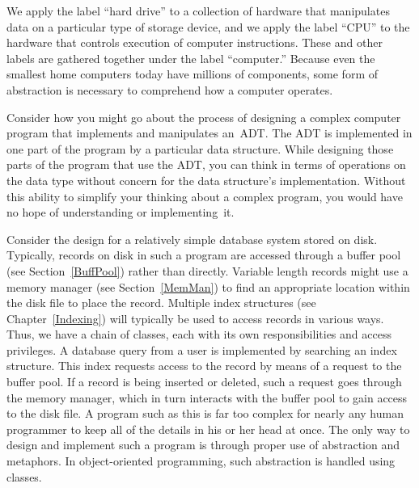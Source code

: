 \begin{example}
We apply the label ``hard drive'' to a collection of
hardware that manipulates data on a particular type of
storage device, and we apply the label ``CPU'' to the hardware that
controls execution of computer instructions.
These and other labels are gathered together under the label
``computer.''
Because even the smallest home computers today have millions of
components, some form of abstraction is necessary to comprehend how a
computer operates.
\end{example}

Consider how you might go about the process of designing a complex
computer program that implements and manipulates an~ADT.
The ADT is implemented in one part
of the program by a particular data structure.
While designing those parts of the program that use the ADT,
you can think in terms of operations on the data type without
concern for the data structure's implementation.
Without this ability to simplify your thinking about a complex
program, you would have no hope of understanding or implementing~it.

\begin{example}
Consider the design for a relatively simple database system stored on
disk.
Typically, records on disk in such a program are accessed through a
buffer pool (see Section~\ref{BuffPool}) rather
than directly.
Variable length records might use a
memory manager (see Section~\ref{MemMan}) to
find an appropriate location within the disk file to place the record.
Multiple index structures (see Chapter~\ref{Indexing})
will typically be used to access records in various ways.
Thus, we have a chain of classes, each with its own responsibilities
and access privileges.
A database query from a user is implemented by searching an index
structure.
This index requests access to the record by means of a request to the
buffer pool.
If a record is being inserted or deleted, such a request goes through
the memory manager, which in turn interacts with the buffer pool to
gain access to the disk file.
A program such as this is far too complex for nearly any human
programmer to keep all of the details in his or her head at once.
The only way to design and implement such a program is through proper
use of abstraction and metaphors.
In object-oriented programming,
such abstraction is handled using classes.
\end{example}

